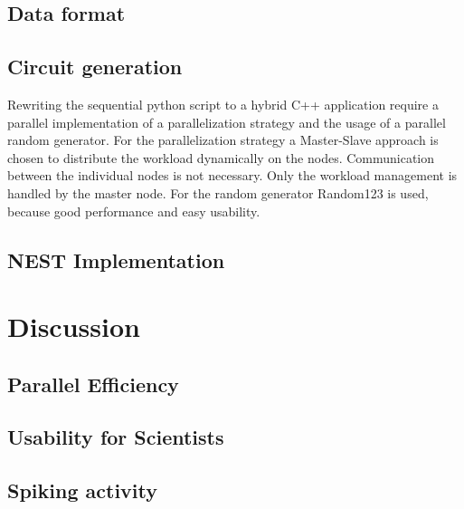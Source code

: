 \documentclass[a4paper]{article}
\begin{document}
\subsection{Data format}



\subsection{Circuit generation}
Rewriting the sequential python script to a hybrid C++ application require a parallel implementation of a parallelization strategy and the usage of 
a parallel random generator. For the parallelization strategy a Master-Slave approach is chosen to distribute the workload dynamically on the nodes.
Communication between the individual nodes is not necessary. Only the workload management is handled by the master node.
For the random generator Random123 is used, because good performance and easy usability.
\subsection{NEST Implementation}
\section{Discussion}
\subsection{Parallel Efficiency}
\subsection{Usability for Scientists}
\subsection{Spiking activity}
\end{document}
